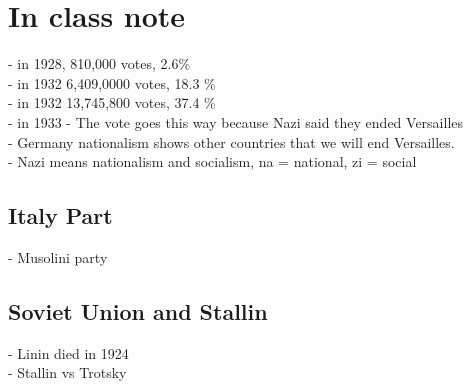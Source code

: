 \documentclass{article}
\begin{document}
\section{In class note}
- in 1928, 810,000 votes,  2.6\% \\
- in 1932 6,409,0000 votes, 18.3 \% \\
- in 1932 13,745,800 votes, 37.4 \% \\
- in 1933                   
- The vote goes this way because Nazi said they ended Versailles\\
- Germany nationalism shows other countries that we will end Versailles.\\
- Nazi means nationalism and socialism, na = national, zi = social\\
\subsection{ Italy Part}
- Musolini party
\subsection{Soviet Union and Stallin}
- Linin died in 1924\\
- Stallin vs Trotsky\\
\end{document}
